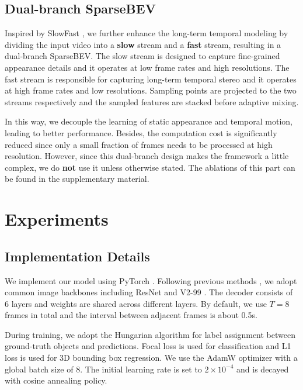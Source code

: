 \documentclass[10pt,twocolumn,letterpaper]{article}
\begin{document}
\subsection{Dual-branch SparseBEV}

Inspired by SlowFast \cite{slowfast}, we further enhance the long-term temporal modeling by dividing the input video into a \textbf{slow} stream and a \textbf{fast} stream, resulting in a dual-branch SparseBEV.
The slow stream is designed to capture fine-grained appearance details and it operates at low frame rates and high resolutions. The fast stream is responsible for capturing long-term temporal stereo and it operates at high frame rates and low resolutions.
Sampling points are projected to the two streams respectively and the sampled features are stacked before adaptive mixing.

In this way, we decouple the learning of static appearance and temporal motion, leading to better performance. Besides, the computation cost is significantly reduced since only a small fraction of frames needs to be processed at high resolution. However, since this dual-branch design makes the framework a little complex, we do \textbf{not} use it unless otherwise stated. The ablations of this part can be found in the supplementary material.

\section{Experiments}

\subsection{Implementation Details}

We implement our model using PyTorch \cite{pytorch}. Following previous methods \cite{detr3d, bevformer, petrv2, solofusion}, we adopt common image backbones including ResNet \cite{resnet} and V2-99 \cite{vovnet2}.
The decoder consists of 6 layers and weights are shared across different layers. By default, we use $T=8$ frames in total and the interval between adjacent frames is about 0.5s.

During training, we adopt the Hungarian algorithm \cite{hungarian} for label assignment between ground-truth objects and predictions. Focal loss \cite{focalloss} is used for classification and L1 loss is used for 3D bounding box regression. We use the AdamW \cite{adamw} optimizer with a global batch size of 8. The initial learning rate is set to $2 \times 10^{-4}$ and is decayed with cosine annealing policy.
\end{document}
